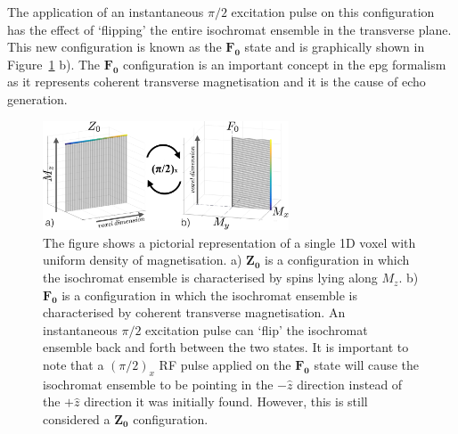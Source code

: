 \hfill

The application of an instantaneous $\pi/2$ excitation pulse on this configuration has the effect of `flipping' the entire isochromat ensemble in the transverse plane.
This new configuration is known as the $\bm{F_0}$ state \cite{Weigel2015} \cite{Scheffler1999} \cite{Hennig1991} and is graphically shown in Figure~\ref{fig:Z0F0states} b).
The $\bm{F_0}$ configuration is an important concept in the \ac{epg} formalism as it represents coherent transverse magnetisation and it is the cause of echo generation.
% 
% 

\begin{figure}[H]
    \centering
    \includegraphics[angle=0,width=0.65\textwidth, keepaspectratio]{images/mrf/Z0F0states}
    \caption{The figure shows a pictorial representation of a single 1D voxel with uniform density of magnetisation.
    a) $\bm{Z_0}$ is a configuration in which the isochromat ensemble is characterised by spins lying along $M_z$.
    b) $\bm{F_0}$ is a configuration in which the isochromat ensemble is characterised by coherent transverse magnetisation.
    An instantaneous $\pi/2$ excitation pulse can `flip' the isochromat ensemble back and forth between the two states.
    It is important to note that a $(\pi/2)_x$ RF pulse applied on the $\bm{F_0}$ state will cause the isochromat ensemble to be pointing in the $- \hat{z}$ direction instead of the $+ \hat{z}$ direction it was initially found.
    However, this is still considered a $\bm{Z_0}$ configuration.
    }
    \label{fig:Z0F0states}
\end{figure}


